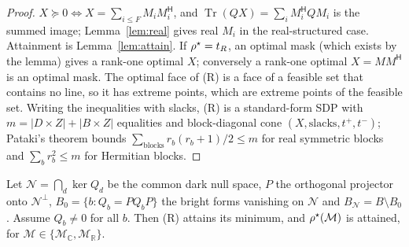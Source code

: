 \documentclass[11pt,a4paper]{article}
\theoremstyle{remark}\newtheorem*{remark}{Remark}
\newcommand{\R}{\mathbb{R}}\newcommand{\C}{\mathbb{C}}\newcommand{\PSD}{\succeq 0}
\DeclareMathOperator{\Tr}{Tr}\DeclareMathOperator{\rank}{rank}\DeclareMathOperator{\conj}{conj}
\begin{document}
\begin{proof}
$X\PSD\iff X=\sum_{i\le F}M_iM_i^{\mathsf H}$, and $\Tr(QX)=\sum_i M_i^{\mathsf H}QM_i$ is the summed image; Lemma~\ref{lem:real} gives real $M_i$ in the real-structured case. Attainment is Lemma~\ref{lem:attain}. If $\rho^{\star}=t_R$, an optimal mask (which exists by the lemma) gives a rank-one optimal $X$; conversely a rank-one optimal $X=MM^{\mathsf H}$ is an optimal mask. The optimal face of (R) is a face of a feasible set that contains no line, so it has extreme points, which are extreme points of the feasible set. Writing the inequalities with slacks, (R) is a standard-form SDP with $m=|D\times Z|+|B\times Z|$ equalities and block-diagonal cone $(X,\text{slacks},t^+,t^-)$; Pataki's theorem \cite{pataki1998} bounds $\sum_{\text{blocks}}r_b(r_b+1)/2\le m$ for real symmetric blocks and $\sum_b r_b^2\le m$ for Hermitian blocks.
\end{proof}
\begin{lemma}[Attainment]\label{lem:attain}
Let $\mathcal N=\bigcap_{d}\ker Q_d$ be the common dark null space, $P$ the orthogonal projector onto $\mathcal N^\perp$, $B_0=\{b:Q_b=PQ_bP\}$ the bright forms vanishing on $\mathcal N$ and $B_{\mathcal N}=B\setminus B_0$. Assume $Q_b\ne0$ for all $b$. Then (R) attains its minimum, and $\rho^{\star}(\mathcal M)$ is attained, for $\mathcal M\in\{\mathcal M_\C,\mathcal M_\R\}$.
\end{lemma}
\end{document}
